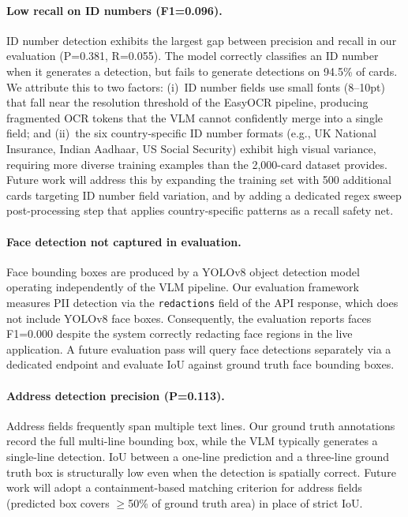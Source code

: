 \documentclass[conference]{IEEEtran}
\begin{document}
\paragraph{Low recall on ID numbers (F1=0.096).}
ID number detection exhibits the largest gap between
precision and recall in our evaluation (P=0.381,
R=0.055).
The model correctly classifies an ID number when it
generates a detection, but fails to generate detections
on 94.5\% of cards.
We attribute this to two factors: (i)~ID number fields
use small fonts (8--10pt) that fall near the resolution
threshold of the EasyOCR pipeline, producing fragmented
OCR tokens that the VLM cannot confidently merge into a
single field; and (ii)~the six country-specific ID
number formats (e.g., UK National Insurance, Indian
Aadhaar, US Social Security) exhibit high visual
variance, requiring more diverse training examples than
the 2,000-card dataset provides.
Future work will address this by expanding the training
set with 500 additional cards targeting ID number field
variation, and by adding a dedicated regex sweep
post-processing step that applies country-specific
patterns as a recall safety net.

\paragraph{Face detection not captured in evaluation.}
Face bounding boxes are produced by a YOLOv8
object detection model operating independently of the
VLM pipeline.
Our evaluation framework measures PII detection via the
\texttt{redactions} field of the API response, which
does not include YOLOv8 face boxes.
Consequently, the evaluation reports faces F1=0.000
despite the system correctly redacting face regions
in the live application.
A future evaluation pass will query face detections
separately via a dedicated endpoint and evaluate IoU
against ground truth face bounding boxes.

\paragraph{Address detection precision (P=0.113).}
Address fields frequently span multiple text lines.
Our ground truth annotations record the full
multi-line bounding box, while the VLM typically
generates a single-line detection.
IoU between a one-line prediction and a three-line
ground truth box is structurally low even when
the detection is spatially correct.
Future work will adopt a containment-based matching
criterion for address fields (predicted box covers
$\geq$50\% of ground truth area) in place of strict
IoU.
\end{document}
